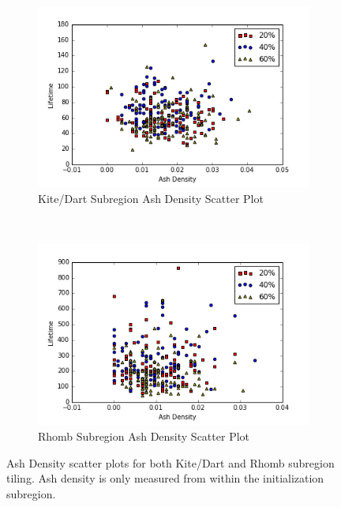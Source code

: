 \documentclass[a4paper,11pt,twoside]{report}
\begin{document}
\begin{figure}[htp]
\centering
	\begin{subfigure}[t]{0.6\textwidth}
	\includegraphics[width=\textwidth]{ch4_figs/ckdx_sub_ash_density}
	\caption{Kite/Dart Subregion Ash Density Scatter Plot}
	\label{fig:ckd_sub_ash_density}
	\end{subfigure}
~
	\begin{subfigure}[t]{0.6\textwidth}
	\centering
	\includegraphics[width=\textwidth]{ch4_figs/crhx_sub_ash_density}
	\caption{Rhomb Subregion Ash Density Scatter Plot}
	\label{fig:crh_sub_ash_density}
	\end{subfigure}
\caption[Subregion Ash Density Plots]{
	Ash Density scatter plots for both Kite/Dart and Rhomb subregion tiling. Ash density is only measured from within the initialization subregion.
	}
\end{figure}
\end{document}
